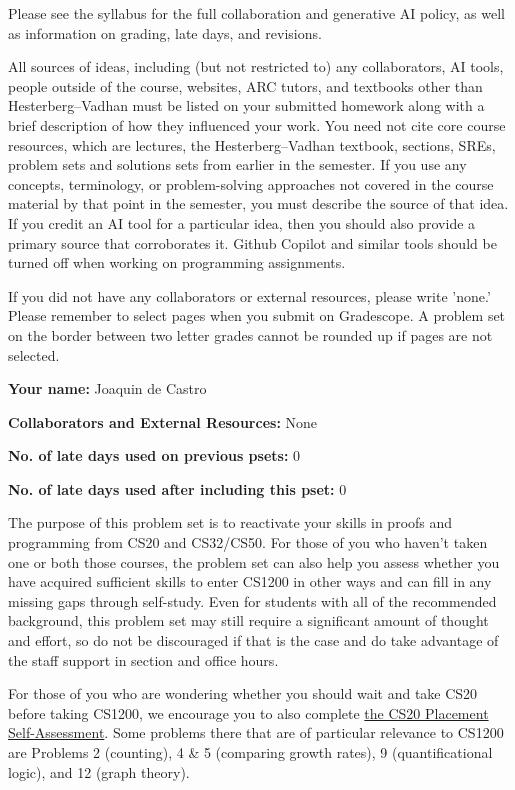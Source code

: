 \documentclass[11pt]{article}
\begin{document}

Please see the syllabus for the full collaboration and generative AI policy, as well as information on grading, late days, and revisions.

All sources of ideas, including (but not restricted to) any collaborators, AI tools, people outside of the course, websites, ARC tutors, and textbooks other than Hesterberg--Vadhan must be listed on your submitted homework along with a brief description of how they influenced your work. You need not cite core course resources, which are lectures, the Hesterberg--Vadhan textbook, sections, SREs, problem sets and solutions sets from earlier in the semester. If you use any concepts, terminology, or problem-solving approaches not covered in the course material by that point in the semester, you must describe the source of that idea. If you credit an AI tool for a particular idea, then you should also provide a primary source that corroborates it. Github Copilot and similar tools should be turned off when working on programming assignments.

If you did not have any collaborators or external resources, please write 'none.' Please remember to select pages when you submit on Gradescope. A problem set on the border between two letter grades cannot be rounded up if pages are not selected.
\newline

\textbf{Your name:}  Joaquin de Castro

\textbf{Collaborators and External Resources:} None

\textbf{No. of late days used on previous psets:} 0

\textbf{No. of late days used after including this pset:} 0

\vspace{1em}

The purpose of this problem set is to reactivate your skills in proofs and programming from CS20 and CS32/CS50. For those of you who haven't taken one or both those courses, the problem set can also help you assess whether you have acquired sufficient skills to enter CS1200 in other ways and can fill in any missing gaps through self-study. Even for students with all of the recommended background, this problem set may still require a significant amount of thought and effort, so do not be discouraged if that is the case and do take advantage of the staff support in section and office hours.

For those of you who are wondering whether you should wait and take CS20 before taking CS1200, we encourage you to also complete  \href{https://drive.google.com/file/d/1QIJR6sb9hfkK67PhpQaK9KQBzYwzXvsW/view}{the CS20 Placement Self-Assessment}.  Some problems there that are of particular relevance to CS1200 are Problems 2 (counting), 4 \& 5 (comparing growth rates), 9 (quantificational logic), and 12 (graph theory).
\end{document}
